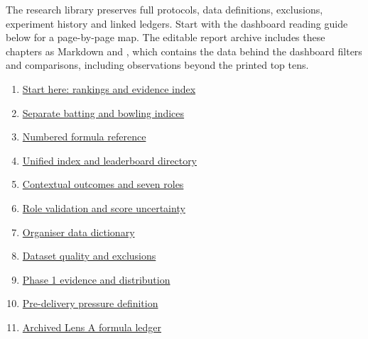 The research library preserves full protocols, data definitions, exclusions, experiment history and linked ledgers. Start with the dashboard reading guide below for a page-by-page map. The editable report archive includes these chapters as Markdown and , which contains the data behind the dashboard filters and comparisons, including observations beyond the printed top tens.

\begin{enumerate}

\item \href{https://dashboard-seven-delta-35.vercel.app/library.html\#reading-guide}{Start here: rankings and evidence index}

\item \href{https://dashboard-seven-delta-35.vercel.app/library.html\#discipline}{Separate batting and bowling indices}

\item \href{https://dashboard-seven-delta-35.vercel.app/library.html\#formula-reference}{Numbered formula reference}

\item \href{https://dashboard-seven-delta-35.vercel.app/library.html\#unified}{Unified index and leaderboard directory}

\item \href{https://dashboard-seven-delta-35.vercel.app/library.html\#roles}{Contextual outcomes and seven roles}

\item \href{https://dashboard-seven-delta-35.vercel.app/library.html\#role-validation}{Role validation and score uncertainty}

\item \href{https://dashboard-seven-delta-35.vercel.app/library.html\#source-dictionary}{Organiser data dictionary}

\item \href{https://dashboard-seven-delta-35.vercel.app/library.html\#source-audit}{Dataset quality and exclusions}

\item \href{https://dashboard-seven-delta-35.vercel.app/library.html\#phase-one}{Phase 1 evidence and distribution}

\item \href{https://dashboard-seven-delta-35.vercel.app/library.html\#pressure-method}{Pre-delivery pressure definition}

\item \href{https://dashboard-seven-delta-35.vercel.app/library.html\#v1}{Archived Lens A formula ledger}


\end{enumerate}

